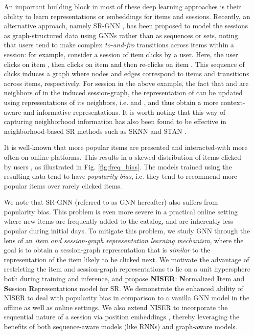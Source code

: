 \documentclass[sigconf]{acmart}
\begin{document}
An important building block in most of these deep learning approaches is their ability to learn representations or embeddings for items and sessions.
Recently, an alternative approach, namely SR-GNN \cite{wu2018session}, has been proposed to model the sessions as graph-structured data using GNNs \cite{li2015gated} rather than as sequences or sets, noting that users tend to make complex \textit{to-and-fro} transitions across items within a session:
for example, consider a session  of item clicks by a user. Here, the user clicks on item , then clicks on item  and then re-clicks on item . 
This sequence of clicks induces a graph where nodes and edges correspond to items and transitions across items, respectively.
For session  in the above example, the fact that  and  are neighbors of  in the induced session-graph, the representation of  can be updated using representations of its neighbors, i.e.  and , and thus obtain a more context-aware and informative representations. 
It is worth noting that this way of capturing neighborhood information has also been found to be effective in neighborhood-based SR methods such as SKNN \cite{jannach2017recurrent} and STAN \cite{garg2019sequence}.

It is well-known that more popular items are presented and interacted-with more often on online platforms. This results in a skewed distribution of items clicked by users  \cite{steck2011item,abdollahpouri2017controlling,yang2018unbiased}, as illustrated in Fig. \ref{fig:freq_bias}.
The models trained using the resulting data tend to have \textit{popularity bias}, i.e. they tend to recommend more popular items over rarely clicked items. 

We note that SR-GNN (referred to as GNN hereafter) also suffers from popularity bias. 
This problem is even more severe in a practical online setting where new items are frequently added to the catalog, and are inherently less popular during initial days.
To mitigate this problem, we study GNN through the lens of an \textit{item and session-graph representation learning mechanism}, where the goal is to obtain a session-graph representation that is \textit{similar} to the representation of the item likely to be clicked next.
We motivate the advantage of restricting the item and session-graph representations to lie on a unit hypersphere both during training and inference, and propose \textbf{NISER}: \textbf{N}ormalized \textbf{I}tem and \textbf{Se}ssion \textbf{R}epresentations model for SR. 
We demonstrate the enhanced ability of NISER to deal with popularity bias in comparison to a vanilla GNN model in the offline as well as online settings. 
We also extend NISER to incorporate the sequential nature of a session via position embeddings \cite{vaswani2017attention}, thereby leveraging the benefits of both sequence-aware models (like RNNs) and graph-aware models.
\end{document}
